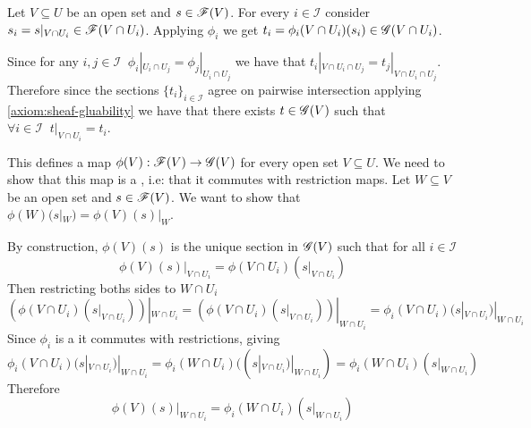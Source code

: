 \documentclass[../main.tex]{subfiles}
\begin{document}
\begin{remark}
\begin{itemize}
          Let \(V \subseteq U\) be an open set and \(s \in \mathscr{F}(V)\).
          For every \(i \in \mathcal{I}\) consider \(s_{i} = s|_{V \cap U_{i}} \in \mathscr{F}(V \cap U_{i})\).
          Applying \(\phi_{i}\) we get \(t_{i} = \phi_{i}(V \cap U_{i})(s_{i}) \in \mathscr{G}(V \cap U_{i})\).

          Since for any \(i, j \in \mathcal{I} \;\; \phi_{i}|_{U_{i} \cap U_{j}} = \phi_{j}|_{U_{i} \cap U_{j}}\) we have that \(t_{i}|_{V \cap U_{i} \cap U_{j}} = t_{j}|_{V \cap U_{i} \cap U_{j}}\).
          Therefore since the sections \(\{t_{i}\}_{i \in \mathcal{I}}\) agree on pairwise intersection applying \ref{axiom:sheaf-gluability} we have that there exists \(t \in \mathscr{G}(V)\) such that \(\forall i \in \mathcal{I} \;\; t|_{V \cap U_{i}} = t_{i}\).

          This defines a map \(\phi(V): \mathscr{F}(V) \to \mathscr{G}(V)\) for every open set \(V \subseteq U\).
          We need to show that this map is a , i.e: that it commutes with restriction maps.
          Let \(W \subseteq V\) be an open set and \(s \in \mathscr{F}(V)\). We want to show that \(\phi(W)(s|_{W}) = \phi(V)(s)|_{W}\).

          By construction, \(\phi(V)(s)\) is the unique section in \(\mathscr{G}(V)\) such that for all \(i \in \mathcal{I}\)
          \begin{equation*}
            \phi(V)(s)|_{V \cap U_{i}} = \phi(V \cap U_{i})(s|_{V \cap U_{i}})
          \end{equation*}
          Then restricting boths sides to \(W \cap U_{i}\)
          \begin{equation*}
            \left( \phi(V \cap U_{i})(s|_{V \cap U_{i}}) \right)|_{W \cap U_{i}} = \left( \phi(V \cap U_{i})(s|_{V \cap U_{i}}) \right)|_{W \cap U_{i}} = \phi_{i}(V \cap U_{i})(s|_{V \cap U_{i}})|_{W \cap U_{i}}
          \end{equation*}
          Since \(\phi_{i}\) is a  it commutes with restrictions, giving
          \begin{equation*}
             \phi_{i}(V \cap U_{i})(s|_{V \cap U_{i}})|_{W \cap U_{i}} = \phi_{i}(W \cap U_{i})((s|_{V \cap U_{i}})|_{W \cap U_{i}}) = \phi_{i}(W \cap U_{i})(s|_{W \cap U_{i}})
           \end{equation*}
          Therefore
          \begin{equation*}
            \phi(V)(s)|_{W \cap U_{i}} = \phi_{i}(W \cap U_{i})(s|_{W \cap U_{i}})
          \end{equation*}


\end{itemize}
\end{remark}
\end{document}
